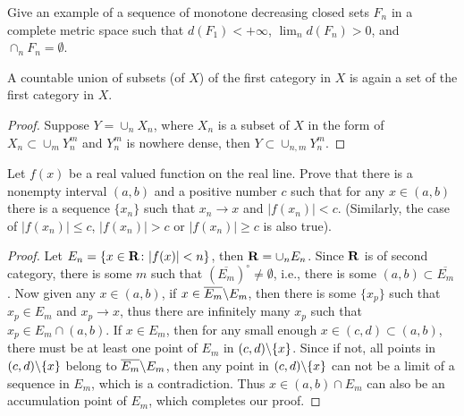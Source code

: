 \begin{pro}%
	Give an example of a sequence of monotone decreasing closed sets $F_n$ in a complete metric space such that $d(F_1)<+\infty$, $\lim_n d(F_n)>0$, and $\cap_n F_n=\emptyset$.
\end{pro}

\begin{pro}%
	A countable union of subsets (of $X$) of the first category in $X$ is again a set of the first category in $X$.
\end{pro}
\begin{proof}
	Suppose $Y=\cup_n X_n$, where $X_n$ is a subset of $X$ in the form of $X_n\subset \cup_m Y_n^m$ and $Y_n^m$ is nowhere dense, then $Y\subset \cup_{n,m} Y_n^m$.
\end{proof}

\begin{pro}%
	Let $f(x)$ be a real valued function on the real line. Prove that there is a nonempty interval $(a,b)$ and a positive number $c$ such that for any $x\in (a,b)$ there is a sequence $\{x_n\}$ such that $x_n\to x$ and $|f(x_n)|<c$. (Similarly, the case of $|f(x_n)|\leq c$, $|f(x_n)|> c$ or $|f(x_n)|\geq c$ is also true).
\end{pro}
\begin{proof}
	Let $E_n=\{x\in\mathbf{R}\colon |f(x)|<n\}$, then $\mathbf{R}=\cup_n E_n$. Since $\mathbf{R}$ is of second category, there is some $m$ such that $(\overline{E_m})^{\circ}\neq \emptyset$, i.e., there is some $(a,b)\subset \overline{E_m}$. 
	Now given any $x\in (a,b)$, if $x\in \overline{E_m}\backslash E_m$, then there is some $\{x_p\}$ such that $x_p\in E_m$ and $x_p\to x$, thus there are infinitely many $x_p$ such that $x_p\in E_m\cap(a,b)$. If $x\in E_m$, then for any small enough $x\in (c,d)\subset (a,b)$, there must be at least one point of $E_m$ in $(c,d)\backslash \{x\}$. Since if not, all points in $(c,d)\backslash \{x\}$ belong to $\overline{E_m}\backslash E_m$, then any point in $(c,d)\backslash \{x\}$ can not be a limit of a sequence in $E_m$, which is a contradiction. Thus $x\in (a,b)\cap E_m$ can also be an accumulation point of $E_m$, which completes our proof.
\end{proof}

